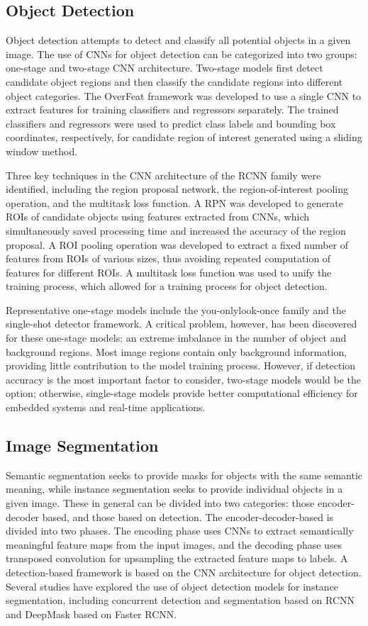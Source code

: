 \subsection{Object Detection}
Object detection attempts to detect and classify all potential objects in a given image. The use of CNNs for object detection can be categorized into two groups:
one-stage and two-stage CNN architecture. Two-stage models first detect candidate object regions and then classify the candidate regions into different object categories.
The OverFeat framework was developed to use a single CNN to extract features for training classifiers and regressors separately. The trained classifiers and regressors
were used to predict class labels and bounding box coordinates, respectively, for candidate region of interest generated using a sliding window method.

Three key techniques in the CNN architecture of the RCNN family were identified, including the region proposal network, the region-of-interest pooling operation, and
the multitask loss function. A RPN was developed to generate ROIs of candidate objects using features extracted from CNNs, which simultaneously saved processing time
and increased the accuracy of the region proposal. A ROI pooling operation was developed to extract a fixed number of features from ROIs of various sizes, thus avoiding
repeated computation of features for different ROIs. A multitask loss function was used to unify the training process, which allowed for a training process for object
detection. 

Representative one-stage models include the you-onlylook-once family and the single-shot detector framework. A critical problem, however, has been
discovered for these one-stage models: an extreme imbalance in the number of object and background regions. Most image regions contain only background information,
providing little contribution to the model training process. However, if detection accuracy is the most important factor to consider, two-stage models would be
the option; otherwise, single-stage models provide better computational efficiency for embedded systems and real-time applications.

\subsection{Image Segmentation}
Semantic segmentation seeks to provide masks for objects with the same semantic meaning, while instance segmentation seeks to provide individual objects in a given image.
These in general can be divided into two categories: those encoder-decoder based, and those based on detection. The encoder-decoder-based is divided into two phases.
The encoding phase uses CNNs to extract semantically meaningful feature maps from the input images, and the decoding phase uses transposed convolution for upsampling
the extracted feature maps to labels. A detection-based framework is based on the CNN architecture for object detection. Several studies have explored the use of
object detection models for instance segmentation, including concurrent detection and segmentation based on RCNN and DeepMask based on Faster RCNN.

